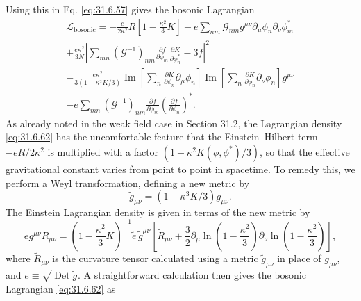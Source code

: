 Using this in Eq. \eqref{eq:31.6.57} gives the bosonic Lagrangian
\begin{multline}
  \mathcal L_{\mathrm{bosonic}}
  =-\frac{e}{2\kappa^2}R
    \left[1-\frac{\kappa^2}{3}K\right]
  -e\sum_{nm}\mathcal G_{nm}g^{\mu\nu}
    \partial_\mu\phi_n\partial_\nu\phi_m^*\\
  +\frac{e\kappa^2}{3N}
    \left|
      \sum_{mn}(\mathcal G^{-1})_{nm}
      \frac{\partial f}{\partial\phi_m}
      \frac{\partial K}{\partial\phi_n^*}
      -3f
    \right|^2\\
  -\frac{e\kappa^2}{3(1-\kappa^2K/3)}
    \operatorname{Im}\left[
      \sum_n\frac{\partial K}{\partial\phi_n}\partial_\mu\phi_n
    \right]
    \operatorname{Im}\left[
      \sum_n\frac{\partial K}{\partial\phi_n}\partial_\nu\phi_n
    \right]g^{\mu\nu}\\
  -e\sum_{mn}(\mathcal G^{-1})_{nm}
    \frac{\partial f}{\partial\phi_m}
    \left(\frac{\partial f}{\partial\phi_n}\right)^*.
  \tag{31.6.62}\label{eq:31.6.62}
\end{multline}
As already noted in the weak field case in Section 31.2, the Lagrangian
density \eqref{eq:31.6.62} has the uncomfortable feature that the
Einstein--Hilbert term \(-eR/2\kappa^2\) is multiplied with a factor
\((1-\kappa^2K(\phi,\phi^*)/3)\), so that the effective gravitational
constant varies from point to point in spacetime. To remedy this, we
perform a Weyl transformation, defining a new metric by
\begin{equation}
  \widetilde g_{\mu\nu}
  =(1-\kappa^3K/3)g_{\mu\nu}.
  \tag{31.6.63}\label{eq:31.6.63}
\end{equation}
The Einstein Lagrangian density is given in terms of the new metric by
\[
  eg^{\mu\nu}R_{\mu\nu}
  =\left(1-\frac{\kappa^2}{3}K\right)^{-1}
    \widetilde e\,\widetilde g^{\mu\nu}
    \left[
      \widetilde R_{\mu\nu}
      +\frac{3}{2}\partial_\mu
        \ln\left(1-\frac{\kappa^2}{3}\right)
        \partial_\nu
        \ln\left(1-\frac{\kappa^2}{3}\right)
    \right],
\]
where \(\widetilde R_{\mu\nu}\) is the curvature tensor calculated using
a metric \(\widetilde g_{\mu\nu}\) in place of \(g_{\mu\nu}\), and
\(\widetilde e\equiv\sqrt{\operatorname{Det}\widetilde g}\). A
straightforward calculation then gives the bosonic Lagrangian
\eqref{eq:31.6.62} as

